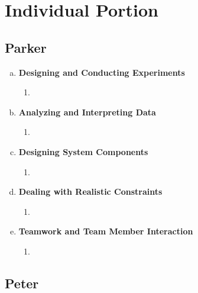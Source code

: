 \documentclass[11pt]{article}   %
\begin{document}
\section{Individual Portion}
\subsection*{Parker}

\begin{enumerate} [a)]
\item  {\bf Designing and Conducting Experiments}
\begin{enumerate} [$\cdot$]
\item 
\end{enumerate}
\item  {\bf Analyzing and Interpreting Data}
\begin{enumerate} [$\cdot$]
\item 
\end{enumerate}
\item {\bf Designing System Components}
\begin{enumerate} [$\cdot$]
\item 
\end{enumerate}
\item {\bf Dealing with Realistic Constraints}
\begin{enumerate} [$\cdot$]
\item 
\end{enumerate}
\item  {\bf Teamwork and Team Member Interaction}
\begin{enumerate} [$\cdot$]
\item 
\end{enumerate}
\end{enumerate}

\subsection*{Peter}
\end{document}
